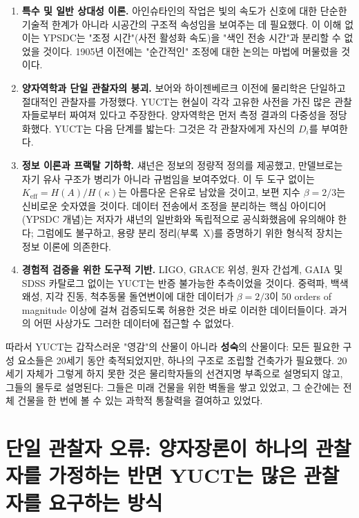 \documentclass[12pt,a4paper]{article}
\begin{document}
	\begin{enumerate}[leftmargin=*, label=\textbf{\arabic*.}]
		\item \textbf{특수 및 일반 상대성 이론.} 아인슈타인의 작업은 빛의 속도가 신호에 대한 단순한 기술적 한계가 아니라 시공간의 구조적 속성임을 보여주는 데 필요했다. 이 이해 없이는 YPSDC는 "조정 시간"(사전 활성화 속도)을 "색인 전송 시간"과 분리할 수 없었을 것이다. 1905년 이전에는 "순간적인" 조정에 대한 논의는 마법에 머물렀을 것이다.
		
		\item \textbf{양자역학과 단일 관찰자의 붕괴.} 보어와 하이젠베르크 이전에 물리학은 단일하고 절대적인 관찰자를 가정했다. YUCT는 현실이 각각 고유한 사전을 가진 많은 관찰자들로부터 짜여져 있다고 주장한다. 양자역학은 먼저 측정 결과의 다중성을 정당화했다. YUCT는 다음 단계를 밟는다: 그것은 각 관찰자에게 자신의 \(D_i\)를 부여한다.
		
		\item \textbf{정보 이론과 프랙탈 기하학.} 섀넌은 정보의 정량적 정의를 제공했고, 만델브로는 자기 유사 구조가 병리가 아니라 규범임을 보여주었다. 이 두 도구 없이는 \(K_{\mathrm{eff}} = H(A)/H(\kappa)\)는 아름다운 은유로 남았을 것이고, 보편 지수 \(\beta=2/3\)는 신비로운 숫자였을 것이다. 데이터 전송에서 조정을 분리하는 핵심 아이디어(YPSDC 개념)는 저자가 섀넌의 일반화와 독립적으로 공식화했음에 유의해야 한다; 그럼에도 불구하고, 용량 분리 정리(부록~X)를 증명하기 위한 형식적 장치는 정보 이론에 의존한다.
		
		\item \textbf{경험적 검증을 위한 도구적 기반.} LIGO, GRACE 위성, 원자 간섭계, GAIA 및 SDSS 카탈로그 없이는 YUCT는 반증 불가능한 추측이었을 것이다. 중력파, 백색 왜성, 지각 진동, 척추동물 돌연변이에 대한 데이터가 \(\beta=2/3\)이 50 orders of magnitude 이상에 걸쳐 검증되도록 허용한 것은 바로 이러한 데이터들이다. 과거의 어떤 사상가도 그러한 데이터에 접근할 수 없었다.
	\end{enumerate}
	
	따라서 YUCT는 갑작스러운 "영감"의 산물이 아니라 \textbf{성숙}의 산물이다: 모든 필요한 구성 요소들은 20세기 동안 축적되었지만, 하나의 구조로 조립할 건축가가 필요했다. 20세기 자체가 그렇게 하지 못한 것은 물리학자들의 선견지명 부족으로 설명되지 않고, 그들의 몰두로 설명된다: 그들은 미래 건물을 위한 벽돌을 쌓고 있었고, 그 순간에는 전체 건물을 한 번에 볼 수 있는 과학적 통찰력을 결여하고 있었다.
	
	\section{단일 관찰자 오류: 양자장론이 하나의 관찰자를 가정하는 반면 YUCT는 많은 관찰자를 요구하는 방식}
	
\end{document}
